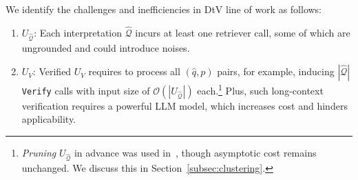 We identify the challenges and inefficiencies in DtV line of work as follows:
\begin{enumerate}


\item $U_{\hat{\mathcal{Q}}}$:
Each interpretation $\hat{\mathcal{Q}}$ incurs at least one retriever call, some of which are ungrounded and could introduce noises.

\item $U_{V}$:
Verified $U_V$ requires to process 
all $(\hat{q},p)$ pairs, for example, inducing $|\hat{\mathcal{Q}}|$ \texttt{Verify} calls with input size of $\mathcal{O}(|U_{\hat{\mathcal{Q}}}|)$ each.\footnote{\emph{Pruning} $U_{\hat{\mathcal{Q}}}$ in advance
 was used in~\citet{in-etal-2024-diversify-arxiv}, though asymptotic cost remains unchanged. We discuss this in Section~\ref{subsec:clustering}.}
Plus, such long-context verification requires a powerful LLM model,
which increases cost and hinders applicability.


\end{enumerate}









